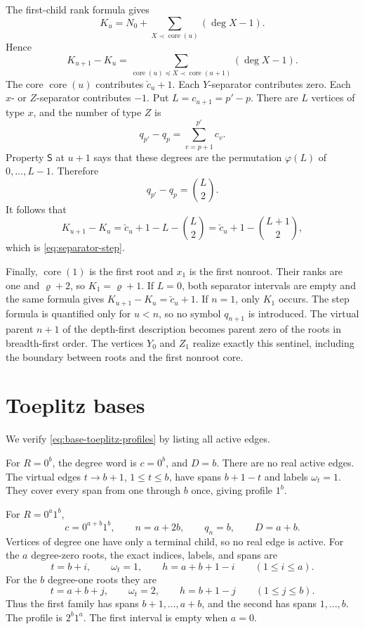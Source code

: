 \documentclass[11pt]{article}
\theoremstyle{definition}
\theoremstyle{remark}
\begin{document}
The first-child rank formula gives
\[
 K_u=N_0+\sum_{X\prec \operatorname{core}(u)}(\deg X-1).
\]
Hence
\[
 K_{u+1}-K_u
 =\sum_{\operatorname{core}(u)\preceq X\prec \operatorname{core}(u+1)}(\deg X-1).
\]
The core \(\operatorname{core}(u)\) contributes \(\check c_u+1\).  Each \(Y\)-separator contributes
zero.  Each \(x\)- or \(Z\)-separator contributes \(-1\).  Put
\(L=c_{u+1}=p'-p\).  There are \(L\) vertices of type \(x\), and the number
of type \(Z\) is
\[
 q_{p'}-q_p=\sum_{v=p+1}^{p'}c_v.
\]
Property \(\mathsf S\) at \(u+1\) says that these degrees are the permutation
\(\varphi(L)\) of \(0,\ldots,L-1\).  Therefore
\[
 q_{p'}-q_p=\binom L2.
\]
It follows that
\[
 K_{u+1}-K_u
 =\check c_u+1-L-\binom L2
 =\check c_u+1-\binom{L+1}{2},
\]
which is \eqref{eq:separator-step}.

Finally, \(\operatorname{core}(1)\) is the first root and \(x_1\) is the first nonroot.  Their
ranks are one and \(\varrho+2\), so \(K_1=\varrho+1\).  If \(L=0\), both
separator intervals are empty and the same formula gives
\(K_{u+1}-K_u=\check c_u+1\).  If \(n=1\), only \(K_1\) occurs.  The step formula is
quantified only for \(u<n\), so no symbol \(q_{n+1}\) is introduced.
The virtual parent \(n+1\) of the depth-first description becomes parent zero
of the roots in breadth-first order.  The vertices \(Y_0\) and \(Z_1\)
realize exactly this sentinel, including the boundary between roots and the
first nonroot core.

\section{Toeplitz bases}
\label{app:toeplitz-bases}

We verify \eqref{eq:base-toeplitz-profiles} by listing all active edges.

For \(R=0^b\), the degree word is \(c=0^b\), and \(D=b\).  There are no real
active edges.  The virtual edges \(t\to b+1\), \(1\leq t\leq b\), have spans
\(b+1-t\) and labels \(\omega_t=1\).  They cover every span from one through \(b\)
once, giving profile \(1^b\).

For \(R=0^a1^b\),
\[
 c=0^{a+b}1^b,
 \qquad n=a+2b,
 \qquad q_n=b,
 \qquad D=a+b.
\]
Vertices of degree one have only a terminal child, so no real edge is active.
For the \(a\) degree-zero roots, the exact indices, labels, and spans are
\[
 t=b+i,
 \qquad \omega_t=1,
 \qquad h=a+b+1-i
 \qquad(1\leq i\leq a).
\]
For the \(b\) degree-one roots they are
\[
 t=a+b+j,
 \qquad \omega_t=2,
 \qquad h=b+1-j
 \qquad(1\leq j\leq b).
\]
Thus the first family has spans \(b+1,\ldots,a+b\), and the second has spans
\(1,\ldots,b\).  The
profile is \(2^b1^a\).  The first interval is empty when \(a=0\).
\end{document}
